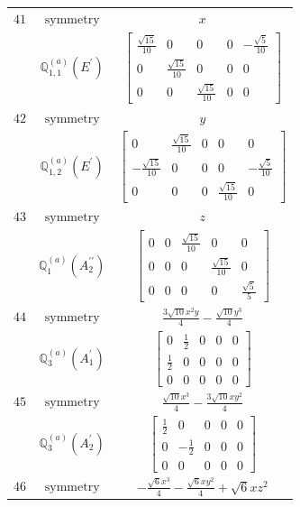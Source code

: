 \documentclass[fleqn,8pt,landscape]{jsarticle}
\begin{document}
\begin{longtable}{ccc}
$ 41 $ & $ \text{symmetry} $ & $ x $ \\
$  $ & $ \mathbb{Q}_{1,1}^{(a)}(E^{\prime}) $ & $ \begin{bmatrix} \frac{\sqrt{15}}{10} & 0 & 0 & 0 & - \frac{\sqrt{5}}{10} \\ 0 & \frac{\sqrt{15}}{10} & 0 & 0 & 0 \\ 0 & 0 & \frac{\sqrt{15}}{10} & 0 & 0 \end{bmatrix} $ \\ \hline
$ 42 $ & $ \text{symmetry} $ & $ y $ \\
$  $ & $ \mathbb{Q}_{1,2}^{(a)}(E^{\prime}) $ & $ \begin{bmatrix} 0 & \frac{\sqrt{15}}{10} & 0 & 0 & 0 \\ - \frac{\sqrt{15}}{10} & 0 & 0 & 0 & - \frac{\sqrt{5}}{10} \\ 0 & 0 & 0 & \frac{\sqrt{15}}{10} & 0 \end{bmatrix} $ \\ \hline
$ 43 $ & $ \text{symmetry} $ & $ z $ \\
$  $ & $ \mathbb{Q}_{1}^{(a)}(A_{2}^{\prime\prime}) $ & $ \begin{bmatrix} 0 & 0 & \frac{\sqrt{15}}{10} & 0 & 0 \\ 0 & 0 & 0 & \frac{\sqrt{15}}{10} & 0 \\ 0 & 0 & 0 & 0 & \frac{\sqrt{5}}{5} \end{bmatrix} $ \\ \hline
$ 44 $ & $ \text{symmetry} $ & $ \frac{3 \sqrt{10} x^{2} y}{4} - \frac{\sqrt{10} y^{3}}{4} $ \\
$  $ & $ \mathbb{Q}_{3}^{(a)}(A_{1}^{\prime}) $ & $ \begin{bmatrix} 0 & \frac{1}{2} & 0 & 0 & 0 \\ \frac{1}{2} & 0 & 0 & 0 & 0 \\ 0 & 0 & 0 & 0 & 0 \end{bmatrix} $ \\ \hline
$ 45 $ & $ \text{symmetry} $ & $ \frac{\sqrt{10} x^{3}}{4} - \frac{3 \sqrt{10} x y^{2}}{4} $ \\
$  $ & $ \mathbb{Q}_{3}^{(a)}(A_{2}^{\prime}) $ & $ \begin{bmatrix} \frac{1}{2} & 0 & 0 & 0 & 0 \\ 0 & - \frac{1}{2} & 0 & 0 & 0 \\ 0 & 0 & 0 & 0 & 0 \end{bmatrix} $ \\ \hline
$ 46 $ & $ \text{symmetry} $ & $ - \frac{\sqrt{6} x^{3}}{4} - \frac{\sqrt{6} x y^{2}}{4} + \sqrt{6} x z^{2} $ \\

\end{longtable}
\end{document}
